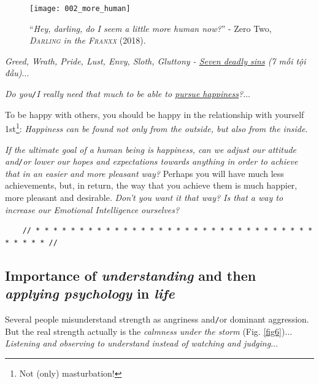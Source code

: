 \documentclass[12pt]{article}
\numberwithin{equation}{section}
\begin{document}
\begin{figure}[h]
    \centering
    \texttt{[image: 002\_more\_human]}
    \caption{``\textit{Hey, darling, do I seem a little more human now?}'' - Zero Two, \textit{\textsc{Darling} in the \textsc{Franxx}} (2018).}
    \label{fig5}
\end{figure}
\textit{Greed, Wrath, Pride, Lust, Envy, Sloth, Gluttony - \href{https://en.wikipedia.org/wiki/Seven_deadly_sins}{Seven deadly sins} (7 mối tội đầu)}$\ldots$

\textit{Do you\texttt{/}I really need that much to be able to \href{https://www.imdb.com/title/tt0454921/}{pursue happiness}?}$\ldots$

To be happy with others, you should be happy in the relationship with yourself 1st\footnote{Not (only) masturbation!}: \textit{Happiness can be found not only from the outside, but also from the inside}.

\textit{If the ultimate goal of a human being is happiness, can we adjust our attitude and\texttt{/}or lower our hopes and expectations towards anything in order to achieve that in an easier and more pleasant way?} Perhaps you will have much less achievements, but, in return, the way that you achieve them is much happier, more pleasant and desirable. \textit{Don't you want it that way? Is that a way to increase our Emotional Intelligence ourselves?}

\begin{verbatim}
    // * * * * * * * * * * * * * * * * * * * * * * * * * * * * * * * * * * * * * //
\end{verbatim}

\subsection{Importance of \textit{understanding} and then \textit{applying psychology} in \textit{life}}
\noindent
{} Several people misunderstand strength as angriness and\texttt{/}or dominant aggression. But the real strength actually is the \textit{calmness under the storm} (Fig. \ref{fig6})$\ldots$ \textit{Listening and observing to understand instead of watching and judging}$\ldots$
\end{document}
